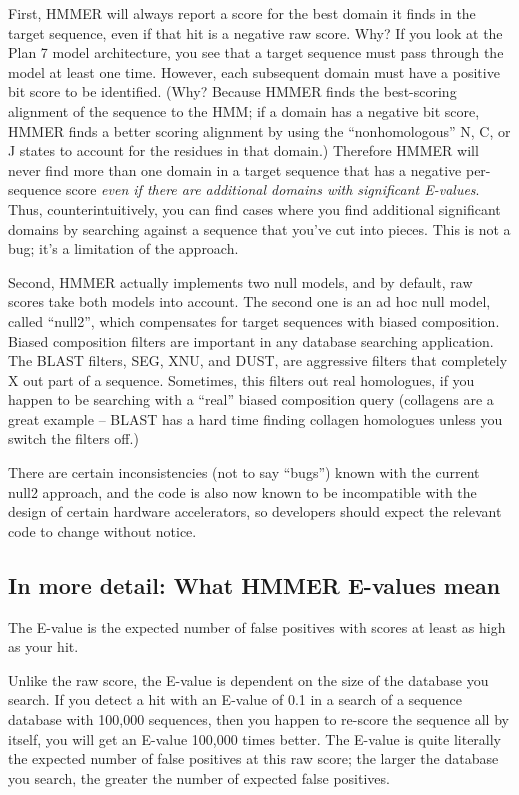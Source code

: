 First, HMMER will always report a score for the best domain it finds
in the target sequence, even if that hit is a negative raw score. Why?
If you look at the Plan 7 model architecture, you see that a target
sequence must pass through the model at least one time. However, each
subsequent domain must have a positive bit score to be identified.
(Why? Because HMMER finds the best-scoring alignment of the sequence
to the HMM; if a domain has a negative bit score, HMMER finds a better
scoring alignment by using the ``nonhomologous'' N, C, or J states to
account for the residues in that domain.) Therefore HMMER will never
find more than one domain in a target sequence that has a negative
per-sequence score \textit{even if there are additional domains with
significant E-values}. Thus, counterintuitively, you can find cases
where you find additional significant domains by searching against a
sequence that you've cut into pieces. This is not a bug; it's a
limitation of the approach.

Second, HMMER actually implements two null models, and by default, raw
scores take both models into account. The second one is an ad hoc null
model, called ``null2'', which compensates for target sequences with
biased composition. Biased composition filters are important in any
database searching application. The BLAST filters, SEG, XNU, and DUST,
are aggressive filters that completely X out part of a
sequence. Sometimes, this filters out real homologues, if you happen
to be searching with a ``real'' biased composition query (collagens
are a great example -- BLAST has a hard time finding collagen
homologues unless you switch the filters off.) 

There are certain inconsistencies (not to say ``bugs'') known with the
current null2 approach, and the code is also now known to be
incompatible with the design of certain hardware accelerators, so
developers should expect the relevant code to change without notice.

\subsection{In more detail: What HMMER E-values mean}

The E-value is the expected number of false positives with scores at
least as high as your hit.

Unlike the raw score, the E-value is dependent on the size of the
database you search. If you detect a hit with an E-value of 0.1 in a
search of a sequence database with 100,000 sequences, then you happen
to re-score the sequence all by itself, you will get an E-value
100,000 times better. The E-value is quite literally the expected
number of false positives at this raw score; the larger the database
you search, the greater the number of expected false positives.

